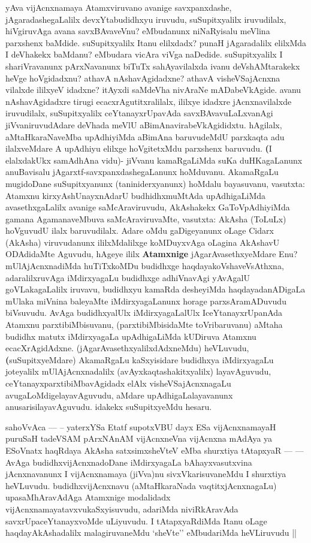 \begin{artha}
yAva vijAcnxnamaya Atamxviruvano avanige savxpanxdashe,
jAgaradashegaLalilx devxYta\-budidhxyu iruvudu, suSupitxyalilx
iruvudilalx, hiVgiruvAga avana savxBAvaveVnu? eMbudanunx niNaRyisalu
meVlina parxshenx baMdide. suSupitxyalilx Itanu \-elilxdadx? punaH
jAgaradalilx elilxMda I deVhakekx baMdanu? eMbudara vicAra viVga
\-naDedide. suSupitxyalilx I shariVravanunx pArxNavanunx biTuTx
sahAyavilalxda ivanu deVshAMtarakekx heVge hoVgidadxnu? athavA
nAshavAgidadxne? athavA visheVSajAcnxna vilalxde ililxyeV idadxne?
itAyxdi saMdeVha nivAraNe mADabeVkAgide. avanu nAshavAgidadxre tirugi
ecacxrAgutitxralilalx, ililxye idadxre jAcnxnavilalxde iruvudilalx,
suSupitxyalilx ceYtanayx\-rUpavAda savxBAvavuLaLxvanAgi
jiVvaniruvudAdare deVhada meVlU aBimAnavira\-beVkAgididxtu. hAgilalx,
aMtaHkaraNaveMba upAdhiyiMda aBimAna baruvudeMdU parxkaqta adu
ilalxveMdare  A upAdhiyu elilxge hoVgitetxMdu parxshenx
baruvudu. \-\textbf(I elalxdakUkx samAdhAna vidu)- jiVvanu kamaRgaLiMda
suKa duHKagaLanunx \-anuBavisalu jAgarxtf-savxpanxdashegaLanunx
hoMduvanu. AkamaRgaLu mugi\-doDane suSupitxyanunx (taniniderxyanunx)
hoMdalu bayasuvanu, vasutxta: Atamxnu kirxyA\-shUnayxnAdarU
budhidhxmuMtAda upAdhigaLiMda avasethxgaLalilx avanige
saMcAraviru\-vudu, AkAshakekx GaToVpAdhiyiMda gamana AgamanaveMbuva
saMcAraviruvaMte, vasutxta: AkAsha (ToLuLx) hoVguvudU ilalx
baruvudilalx. Adare oMdu gaDige\-yanunx oLage Cidarx (AkAsha) viruvudanunx
ililxMdalilxge koMDuyxvAga oLagina \break AkAshavU ODAdidaMte Aguvudu, hAgeye
ililx \textbf{Atamxnige} jAgarAvasethxyeMdare Enu? mUlAjAcnxnadiMda
huTiTxkoMDu budidhxge haqdayakoVshaveVsAthxna, adaralilx\-ruvAga
iMdirxyagaLu budidhxge adhiVnavAgi yAvAgalU goVLakagaLalilx \-iruvavu,
budidhxyu kamaRda desheyiMda haqdayadanADigaLa mUlaka miVnina
baleyaMte iMdirxyagaLanunx horage parxsAramADuvudu biVsuvudu. AvAga
budidhxyalUlx iMdirxyagaLalUlx IceYtanayxrUpanAda Atamxnu
parxtibiMbisuvanu, (parxtibiMbisidaMte toVribaruvanu) aMtaha budidhx
matutx iMdirxyagaLa upAdhigaLiMda kUDiruva Atamxnu
ecacXrAgidAdxne. (jAgarAvasethxyalilxdAdxneMdu) heVLuvudu,
\break \textbf(suSupitxyeMdare) AkamaRgaLu kaSxyisidare budidhxya
iMdirxyagaLu joteyalilx mUlAjAcnxnadalilx (avAyxkaqtashakitxyalilx)
layavAguvudu, ceYtanayxparxtibiMbavAgidadx elAlx visheVSajAcnxnagaLu
avugaLoMdigelayavAguvudu, aMdare upAdhigaLalaya\-vanunx
anusarisilayavAguvudu. idakekx suSupitxyeMdu hesaru.
\end{artha}

\begin{artha}
sahoVvAca {\rm ---} -- yaterxYSa Etatf supotxV\s BU dayx ESa vijAcnxnamayaH
\-puruSaH tadeVSAM pArxNAnAM vijAcnxneVna vijAcnxna mAdAya ya ESoV\s natx
\-haqRdaya AkAsha satxsimxsheVteV eMba shurxtiya tAtapxyaR  {\rm ---}  {\rm ---} AvAga
budidhx\-vijAcnxnadoDane iMdirxyagaLa bAhayxvasutxvina jAcnxnavanunx I
vijAcnxnamaya (jiVva)nu sivxVkarisuvaneMdu I shurxtiya
heVLuvudu. budidhxvijAcnxnavu (aMtaHkaraNada vaqtitxjAcnxnagaLu)
upasaMhAravAdAga Atamxnige modalidadx
vijAcnxnamayatavxvukaSxyisuvudu, adariMda niviRkAravAda
savxrUpaceYtanayxvoMde uLiyuvudu. I tAtapxyaRdiMda Itanu oLage
haqdayAkAshadalilx malagiruvaneMdu `sheVte'' eMbudariMda heVLiruvudu ||
\end{artha}

